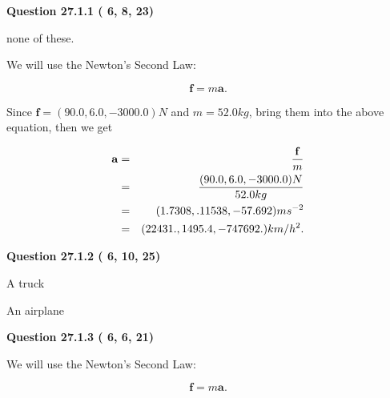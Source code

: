 \documentclass[12pt]{article}
\begin{document}
{\textbf{\Large{Question
27.1.1 
 (          6,          8,         23)
}}}
  
  
 
 
\noindent{}
 
 
none of these.
 
 
 
 
 
 
\noindent{}

We will use the Newton's Second Law:
 
\[
\mathbf{f}=m\mathbf{a}.
\]
 
Since $\mathbf{f}=( %
90.0,  %
6.0,  %
-3000.0 )N$
and $m= %
52.0kg$, bring them into the above equation, then we get
 
\begin{eqnarray*}
\mathbf{a}&=&\frac{\mathbf{f}}m  \\
&=&\frac{(
90.0 ,
6.0 ,
-3000.0 )N
}{ %
52.0 kg}  \\
&=&(
1.7308 ,
.11538,
-57.692
)ms^{-2} \\
&=&(
22431. ,
1495.4 ,
-747692.
)km/h^2.
\end{eqnarray*}
 
 
 
  
\vspace{0.2in}
  
{\textbf{\Large{Question
27.1.2 
 (          6,         10,         25)
}}}
  
  
 
 
\noindent{}
 
 
A truck
 
 
An airplane
 
 
 
 
  
\vspace{0.2in}
  
{\textbf{\Large{Question
27.1.3 
 (          6,          6,         21)
}}}
  
  
 
 
\noindent{}

We will use the Newton's Second Law:
 
\[
\mathbf{f}=m\mathbf{a}.
\]
 
\end{document}
